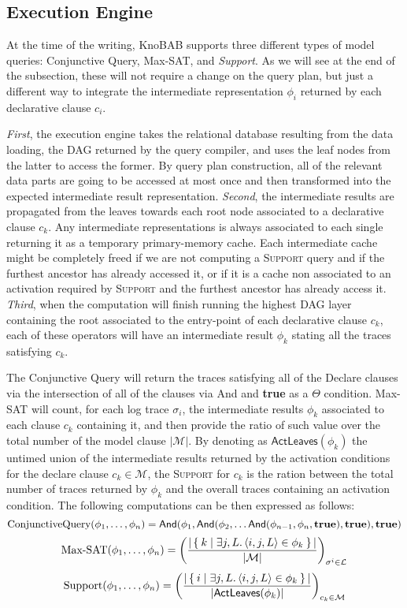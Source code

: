 
\subsection{Execution Engine} \label{ssec:xltlf}
At the time of the writing, KnoBAB supports three different types of model queries: Conjunctive Query, Max-SAT, and \textit{Support}. As we will see at the end of the subsection, these will not require a change on the query plan, but just a different way to integrate the intermediate representation $\phi_i$ returned by each declarative clause $c_i$. 

\textit{First}, the execution engine takes the relational database resulting from the data loading, the DAG returned by the query compiler, and uses the leaf nodes from the latter to access the former. By query plan construction, all of the relevant data parts are going to be accessed at most once and then transformed into the expected intermediate result representation. \textit{Second}, the intermediate results are propagated from the leaves towards each root node associated to a declarative clause $c_k$. Any intermediate representations is always associated to each single returning it as a temporary primary-memory cache. Each intermediate cache  might be completely freed if we are not computing a  \textsc{Support} query and if the furthest ancestor has already accessed it, or if it is a cache non associated to an activation required by \textsc{Support} and the furthest ancestor has already access it. \textit{Third}, when the computation will finish running the highest DAG layer containing the \xLTLf root associated to the entry-point of each declarative clause $c_k$, each of these operators will have an intermediate result $\phi_k$ stating all the traces satisfying $c_k$.

The {Conjunctive Query} will return the traces satisfying all of the Declare clauses via the intersection of all of the clauses via \textsf{And} and \textbf{true} as a $\Theta$ condition. Max-SAT will count, for each log trace $\sigma_i$, the intermediate results $\phi_k$ associated to each clause $c_k$ containing it, and then provide the ratio of such value over the total number of the model clause $|\mathcal{M}|$. By denoting as $\textsf{ActLeaves}(\phi_k)$ the untimed union of the intermediate results returned by the activation conditions for the declare clause $c_k\in\mathcal{M}$, the \textsc{Support} for $c_k$ is the ration between the total number of traces returned by $\phi_k$ and the overall traces containing an activation condition. The following computations can be then expressed as follows:
\[\textup{ConjunctiveQuery}(\phi_1,\dots,\phi_n)=\textsf{And}(\phi_1,\textsf{And}(\phi_2,\dots\textsf{And}(\phi_{n-1},\phi_n,\textbf{true}),\textbf{true}),\textbf{true})\]
\[\textup{Max-SAT}(\phi_1,\dots,\phi_n)=\left(\frac{|\Set{k|\exists j,L. \braket{i,j,L}\in\phi_k}|}{|\mathcal{M}|}\right)_{\sigma^i\in \mathcal{L}}\]
\[\textup{Support}(\phi_1,\dots,\phi_n)=\left(\frac{|\Set{i|\exists j,L. \braket{i,j,L}\in \phi_k}|}{|\textsf{ActLeaves}(\phi_k)|}\right)_{c_k\in \mathcal{M}}\]



